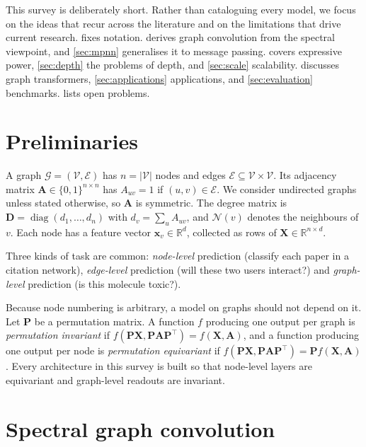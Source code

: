 \documentclass[11pt]{article}
\theoremstyle{plain}
\theoremstyle{definition}
\newcommand{\R}{\mathbb{R}}
\newcommand{\N}{\mathcal{N}}
\newcommand{\G}{\mathcal{G}}
\newcommand{\V}{\mathcal{V}}
\newcommand{\Edges}{\mathcal{E}}
\newcommand{\x}{\mathbf{x}}
\newcommand{\A}{\mathbf{A}}
\newcommand{\D}{\mathbf{D}}
\newcommand{\X}{\mathbf{X}}
\begin{document}
This survey is deliberately short. Rather than cataloguing every model, we focus on the ideas that recur across the literature and on the limitations that drive current research.  fixes notation.  derives graph convolution from the spectral viewpoint, and \cref{sec:mpnn} generalises it to message passing.  covers expressive power, \cref{sec:depth} the problems of depth, and \cref{sec:scale} scalability.  discusses graph transformers, \cref{sec:applications} applications, and \cref{sec:evaluation} benchmarks.  lists open problems.

\section{Preliminaries}
\label{sec:prelim}

A graph $\G = (\V, \Edges)$ has $n = |\V|$ nodes and edges $\Edges \subseteq \V\times\V$. Its adjacency matrix $\A\in\{0,1\}^{n\times n}$ has $A_{uv} = 1$ if $(u,v)\in\Edges$. We consider undirected graphs unless stated otherwise, so $\A$ is symmetric. The degree matrix is $\D = \operatorname{diag}(d_1,\dots,d_n)$ with $d_v = \sum_u A_{uv}$, and $\N(v)$ denotes the neighbours of $v$. Each node has a feature vector $\x_v\in\R^{d}$, collected as rows of $\X\in\R^{n\times d}$.

Three kinds of task are common: \emph{node-level} prediction (classify each paper in a citation network), \emph{edge-level} prediction (will these two users interact?) and \emph{graph-level} prediction (is this molecule toxic?).

Because node numbering is arbitrary, a model on graphs should not depend on it. Let $\mathbf{P}$ be a permutation matrix. A function $f$ producing one output per graph is \emph{permutation invariant} if $f(\mathbf{P}\X, \mathbf{P}\A\mathbf{P}^\top) = f(\X, \A)$, and a function producing one output per node is \emph{permutation equivariant} if $f(\mathbf{P}\X, \mathbf{P}\A\mathbf{P}^\top) = \mathbf{P}f(\X, \A)$. Every architecture in this survey is built so that node-level layers are equivariant and graph-level readouts are invariant.

\section{Spectral graph convolution}
\label{sec:spectral}
\end{document}
